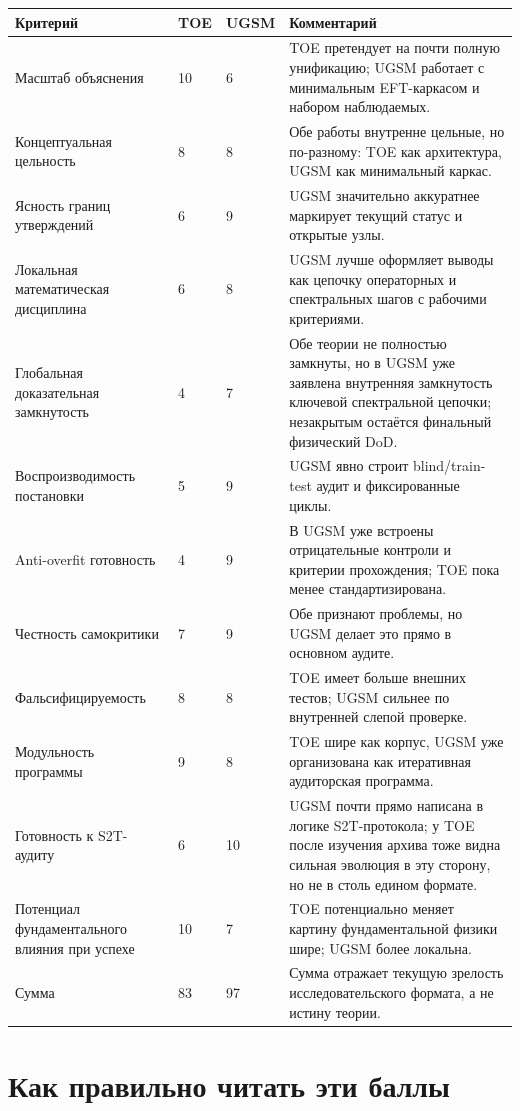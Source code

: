 \documentclass[12pt,a4paper]{article}
\begin{document}
\begin{longtable}{p{5.5cm}p{1.9cm}p{1.9cm}p{5.3cm}}
\toprule
Критерий & TOE & UGSM & Комментарий \\
\midrule
\endhead
Масштаб объяснения & 10 & 6 & TOE претендует на почти полную унификацию; UGSM работает с минимальным EFT-каркасом и набором наблюдаемых. \\
Концептуальная цельность & 8 & 8 & Обе работы внутренне цельные, но по-разному: TOE как архитектура, UGSM как минимальный каркас. \\
Ясность границ утверждений & 6 & 9 & UGSM значительно аккуратнее маркирует текущий статус и открытые узлы. \\
Локальная математическая дисциплина & 6 & 8 & UGSM лучше оформляет выводы как цепочку операторных и спектральных шагов с рабочими критериями. \\
Глобальная доказательная замкнутость & 4 & 7 & Обе теории не полностью замкнуты, но в UGSM уже заявлена внутренняя замкнутость ключевой спектральной цепочки; незакрытым остаётся финальный физический DoD. \\
Воспроизводимость постановки & 5 & 9 & UGSM явно строит blind/train-test аудит и фиксированные циклы. \\
Anti-overfit готовность & 4 & 9 & В UGSM уже встроены отрицательные контроли и критерии прохождения; TOE пока менее стандартизирована. \\
Честность самокритики & 7 & 9 & Обе признают проблемы, но UGSM делает это прямо в основном аудите. \\
Фальсифицируемость & 8 & 8 & TOE имеет больше внешних тестов; UGSM сильнее по внутренней слепой проверке. \\
Модульность программы & 9 & 8 & TOE шире как корпус, UGSM уже организована как итеративная аудиторская программа. \\
Готовность к S2T-аудиту & 6 & 10 & UGSM почти прямо написана в логике S2T-протокола; у TOE после изучения архива тоже видна сильная эволюция в эту сторону, но не в столь едином формате. \\
Потенциал фундаментального влияния при успехе & 10 & 7 & TOE потенциально меняет картину фундаментальной физики шире; UGSM более локальна. \\
\midrule
Сумма & 83 & 97 & Сумма отражает текущую зрелость исследовательского формата, а не истину теории. \\
\bottomrule
\end{longtable}

\section{Как правильно читать эти баллы}
\end{document}
